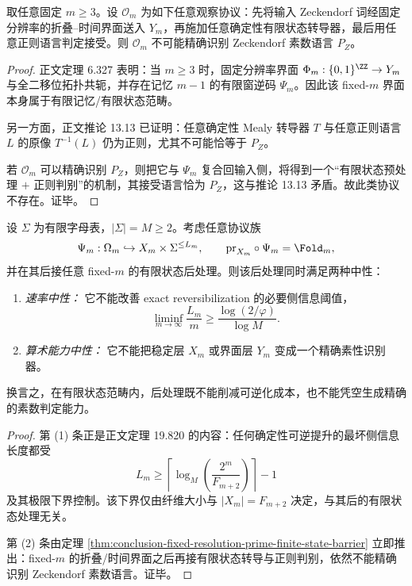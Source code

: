 \begin{theorem}[固定分辨率折叠界面上的素性有限状态屏障]\label{thm:conclusion-fixed-resolution-prime-finite-state-barrier}
取任意固定 \(m\ge 3\)。设 \(\mathcal O_m\) 为如下任意观察协议：先将输入 Zeckendorf 词经固定分辨率的折叠--时间界面送入 \(Y_m\)，再施加任意确定性有限状态转导器，最后用任意正则语言判定接受。则 \(\mathcal O_m\) 不可能精确识别 Zeckendorf 素数语言 \(P_Z\)。
\end{theorem}
\begin{proof}
正文定理 6.327 表明：当 \(m\ge 3\) 时，固定分辨率界面 \(\Phi_m:\{0,1\}^{\ZZ}\to Y_m\) 与全二移位拓扑共轭，并存在记忆 \(m-1\) 的有限窗逆码 \(\Psi_m\)。因此该 fixed-\(m\) 界面本身属于有限记忆/有限状态范畴。

另一方面，正文推论 13.13 已证明：任意确定性 Mealy 转导器 \(T\) 与任意正则语言 \(L\) 的原像 \(T^{-1}(L)\) 仍为正则，尤其不可能恰等于 \(P_Z\)。

若 \(\mathcal O_m\) 可以精确识别 \(P_Z\)，则把它与 \(\Psi_m\) 复合回输入侧，将得到一个“有限状态预处理 \(+\) 正则判别”的机制，其接受语言恰为 \(P_Z\)，这与推论 13.13 矛盾。故此类协议不存在。证毕。
\end{proof}

\begin{theorem}[有限状态后处理的双重中性]\label{thm:conclusion-finite-state-postprocessing-double-neutrality}
设 \(\Sigma\) 为有限字母表，\(|\Sigma|=M\ge 2\)。考虑任意协议族
\[
\Psi_m:\Omega_m\hookrightarrow X_m\times \Sigma^{\le L_m},
\qquad
\mathrm{pr}_{X_m}\circ \Psi_m=\Fold_m,
\]
并在其后接任意 fixed-\(m\) 的有限状态后处理。则该后处理同时满足两种中性：

\begin{enumerate}
\item \emph{速率中性：} 它不能改善 exact reversibilization 的必要侧信息阈值，
\[
\liminf_{m\to\infty}\frac{L_m}{m}\ge \frac{\log(2/\varphi)}{\log M}.
\]

\item \emph{算术能力中性：} 它不能把稳定层 \(X_m\) 或界面层 \(Y_m\) 变成一个精确素性识别器。
\end{enumerate}

换言之，在有限状态范畴内，后处理既不能削减可逆化成本，也不能凭空生成精确的素数判定能力。
\end{theorem}
\begin{proof}
第 (1) 条正是正文定理 19.820 的内容：任何确定性可逆提升的最坏侧信息长度都受
\[
L_m\ge \left\lceil \log_M\!\left(\frac{2^m}{F_{m+2}}\right)\right\rceil-1
\]
及其极限下界控制。该下界仅由纤维大小与 \(|X_m|=F_{m+2}\) 决定，与其后的有限状态处理无关。

第 (2) 条由定理 \ref{thm:conclusion-fixed-resolution-prime-finite-state-barrier} 立即推出：fixed-\(m\) 的折叠/时间界面之后再接有限状态转导与正则判别，依然不能精确识别 Zeckendorf 素数语言。证毕。
\end{proof}
